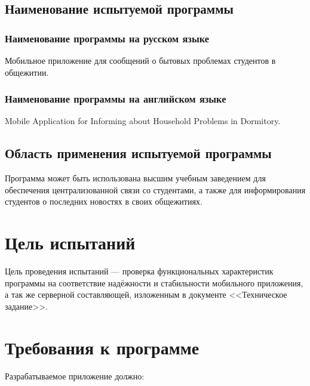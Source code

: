 \documentclass{../includes/TechDoc}
\begin{document}
    \subsection{Наименование испытуемой программы}

    \subsubsection{Наименование программы на русском языке}

    Мобильное приложение для сообщений о бытовых проблемах студентов в общежитии.

    \subsubsection{Наименование программы на английском языке}

    Mobile Application for Informing about Household Problems in Dormitory.

    \subsection{Область применения испытуемой программы}

    Программа может быть использована высшим учебным заведением для обеспечения централизованной связи со студентами, а
    также для информирования студентов о последних новостях в своих общежитиях.


    \section{Цель испытаний}

    Цель проведения испытаний — проверка функциональных характеристик программы на соответствие надёжности и стабильности
    мобильного приложения, а так же серверной составляющей, изложенным в документе <<Техническое задание>>.


    \section{Требования к программе}

    Разрабатываемое приложение должно:
\end{document}
